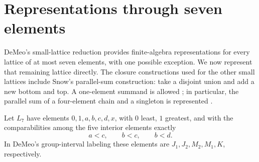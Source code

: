 \section{Representations through seven elements}\label{sec:small}

DeMeo's small-lattice reduction \cite[Theorem~6.1.1 and Chapter~6]{DeMeo2012}
provides finite-algebra representations for every lattice of at most seven
elements, with one possible exception. We now represent that remaining
lattice directly.  The closure constructions used for the other small
lattices include Snow's parallel-sum construction: take a disjoint union
and add a new bottom and top.  A one-element summand is allowed
\citep[Lemma~3.9]{Snow2000}; in particular, the parallel sum of a
four-element chain and a singleton is represented
\citep[Lemma~4.1]{Snow2000}.

\begin{definition}\label{f:def-l7}
Let $L_7$ have elements $0,1,a,b,c,d,x$, with $0$ least, $1$ greatest, and
with the comparabilities among the five interior elements exactly
\[
 a<c,\qquad b<c,\qquad b<d.
\]
In DeMeo's group-interval labeling these elements are
$J_1,J_2,M_2,M_1,K$, respectively.
\end{definition}



